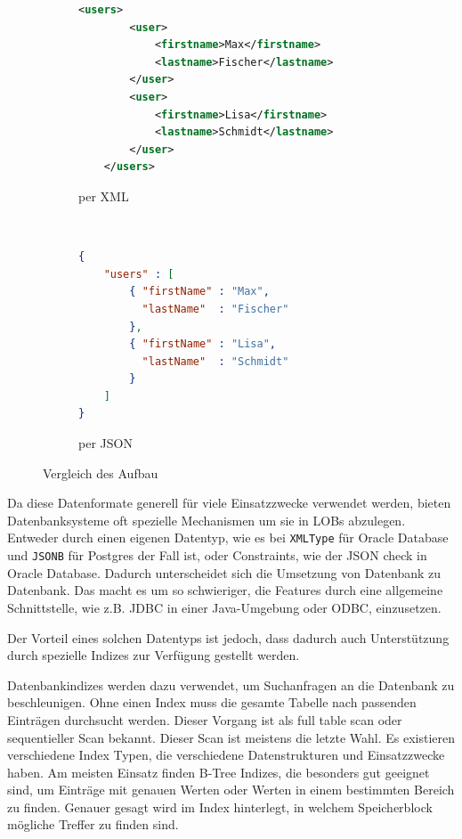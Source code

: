 \begin{figure}
	\begin{adjustbox}{max width=1.4\linewidth,center}
	\centering
	\begin{subfigure}[b]{0.6\textwidth}
		\begin{lstlisting}[language=xml,caption={Beispiel XML}]
	<users>
		<user>
			<firstname>Max</firstname>
			<lastname>Fischer</lastname>
		</user>
		<user>
			<firstname>Lisa</firstname>
			<lastname>Schmidt</lastname>
		</user>
	</users>
\end{lstlisting}
	\caption{per XML}
	\end{subfigure}
	~~~~~~~~
	\begin{subfigure}[b]{0.5\textwidth}
		\begin{lstlisting}[language=json,caption={Beispiel JSON}]
{
	"users" : [
		{ "firstName" : "Max",
		  "lastName"  : "Fischer"
		},
		{ "firstName" : "Lisa",
		  "lastName"  : "Schmidt"
		}
 	]
}
\end{lstlisting}
		\caption{per JSON}
	\end{subfigure}
	\end{adjustbox}
	\caption{Vergleich des Aufbau}
	\label{fig:jsonUML}
\end{figure}


Da diese Datenformate generell für viele Einsatzzwecke verwendet werden, bieten Datenbanksysteme oft spezielle Mechanismen um sie in LOBs abzulegen. Entweder durch einen eigenen Datentyp, wie es bei \lstinline|XMLType| für Oracle Database und \lstinline|JSONB| für Postgres der Fall ist, oder Constraints, wie der JSON check in Oracle Database. Dadurch unterscheidet sich die Umsetzung von Datenbank zu Datenbank. Das macht es um so schwieriger, die Features durch eine allgemeine Schnittstelle, wie z.B. \ac{JDBC} in einer Java-Umgebung oder \ac{ODBC}, einzusetzen.

Der Vorteil eines solchen Datentyps ist jedoch, dass dadurch auch Unterstützung durch spezielle Indizes zur Verfügung gestellt werden.



Datenbankindizes werden dazu verwendet, um Suchanfragen an die Datenbank zu beschleunigen. Ohne einen Index muss die gesamte Tabelle nach passenden Einträgen durchsucht werden. Dieser Vorgang ist als full table scan oder sequentieller Scan bekannt. Dieser Scan ist meistens die letzte Wahl.
Es existieren verschiedene Index Typen, die verschiedene Datenstrukturen und Einsatzzwecke haben.  Am meisten Einsatz finden B-Tree Indizes, die besonders gut geeignet sind, um Einträge mit genauen Werten oder Werten in einem bestimmten Bereich zu finden. Genauer gesagt wird im Index hinterlegt, in welchem Speicherblock mögliche Treffer zu finden sind. 

